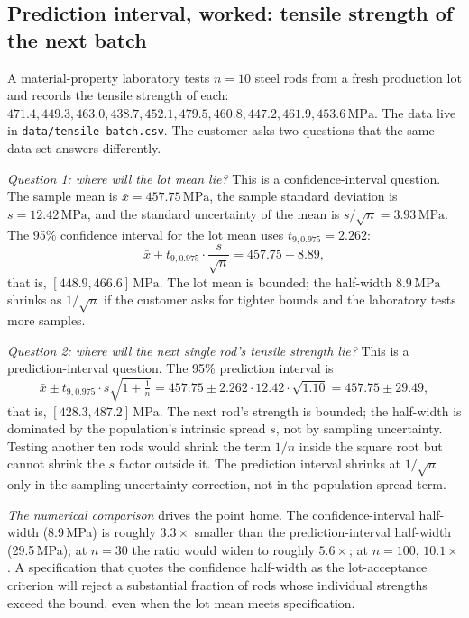\subsection{Prediction interval, worked: tensile strength of the next batch}

A material-property laboratory tests $n = 10$ steel rods from a
fresh production lot and records the tensile strength of each:
$471.4, 449.3, 463.0, 438.7, 452.1, 479.5, 460.8, 447.2, 461.9,
453.6\,\si{\mega\pascal}$. The data live in
\texttt{data/tensile-batch.csv}. The customer asks two questions
that the same data set answers differently.

\emph{Question 1: where will the lot mean lie?} This is a
confidence-interval question. The sample mean is
$\bar{x} = 457.75\,\si{\mega\pascal}$, the sample standard deviation
is $s = 12.42\,\si{\mega\pascal}$, and the standard uncertainty of
the mean is $s/\sqrt{n} = 3.93\,\si{\mega\pascal}$. The 95\%
confidence interval for the lot mean uses $t_{9, 0.975} = 2.262$:
\[
\bar{x} \pm t_{9, 0.975} \cdot \frac{s}{\sqrt{n}} = 457.75 \pm 8.89,
\]
that is, $[448.9, 466.6]\,\si{\mega\pascal}$. The lot mean is
bounded; the half-width $8.9\,\si{\mega\pascal}$ shrinks as
$1/\sqrt{n}$ if the customer asks for tighter bounds and the
laboratory tests more samples.

\emph{Question 2: where will the next single rod's tensile strength
lie?} This is a prediction-interval question. The 95\% prediction
interval is
\[
\bar{x} \pm t_{9, 0.975} \cdot s \sqrt{1 + \tfrac{1}{n}} = 457.75 \pm
2.262 \cdot 12.42 \cdot \sqrt{1.10} = 457.75 \pm 29.49,
\]
that is, $[428.3, 487.2]\,\si{\mega\pascal}$. The next rod's
strength is bounded; the half-width is dominated by the
population's intrinsic spread $s$, not by sampling uncertainty.
Testing another ten rods would shrink the term $1/n$ inside the
square root but cannot shrink the $s$ factor outside it. The
prediction interval shrinks at $1/\sqrt{n}$ only in the
sampling-uncertainty correction, not in the population-spread term.

\emph{The numerical comparison} drives the point home. The
confidence-interval half-width (8.9\,\si{\mega\pascal}) is roughly
$3.3\times$ smaller than the prediction-interval half-width
(29.5\,\si{\mega\pascal}); at $n = 30$ the ratio would widen to
roughly $5.6\times$; at $n = 100$, $10.1\times$. A specification
that quotes the confidence half-width as the lot-acceptance criterion
will reject a substantial fraction of rods whose individual strengths
exceed the bound, even when the lot mean meets specification.

